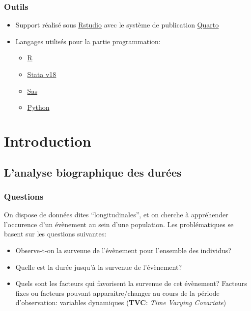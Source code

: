 \documentclass[
  12pt,
  letterpaper,
  DIV=11,
  numbers=noendperiod,
  onepage,
  openany]{scrreprt}
\providecommand{\tightlist}{%
  \setlength{\itemsep}{0pt}\setlength{\parskip}{0pt}}\usepackage{longtable,booktabs,array}
\begin{document}
\hypertarget{outils}{%
\section*{Outils}\label{outils}}


\begin{itemize}
\item
  Support réalisé sous \href{https://posit.co/}{Rstudio} avec le système
  de publication \href{https://quarto.org/}{Quarto}
\item
  Langages utilisés pour la partie programmation:

  \begin{itemize}
  \tightlist
  \item
    \href{https://www.r-project.org/}{R}
  \item
    \href{https://www.stata.com/}{Stata v18}
  \item
    \href{https://www.sas.com/fr_fr/home.html}{Sas}
  \item
    \href{https://www.python.org/}{Python}
  \end{itemize}
\end{itemize}

\part{Introduction}

\hypertarget{lanalyse-biographique-des-duruxe9es}{%
\chapter{\texorpdfstring{\textbf{L'analyse biographique des
durées}}{L'analyse biographique des durées}}\label{lanalyse-biographique-des-duruxe9es}}

\hypertarget{questions}{%
\section{Questions}\label{questions}}

On dispose de données dites ``longitudinales'', et on cherche à
appréhender l'occurence d'un évènement au sein d'une population. Les
problématiques se basent sur les questions suivantes:\\

\begin{itemize}
\tightlist
\item
  Observe-t-on la survenue de l'évènement pour l'ensemble des individus?
\item
  Quelle est la durée jusqu'à la survenue de l'évènement?
\item
  Quels sont les facteurs qui favorisent la survenue de cet évènement?
  Facteurs fixes ou facteurs pouvant apparaitre/changer au cours de la
  période d'observation: variables dynamiques (\textbf{TVC}: \emph{Time
  Varying Covariate})
\end{itemize}
\end{document}
